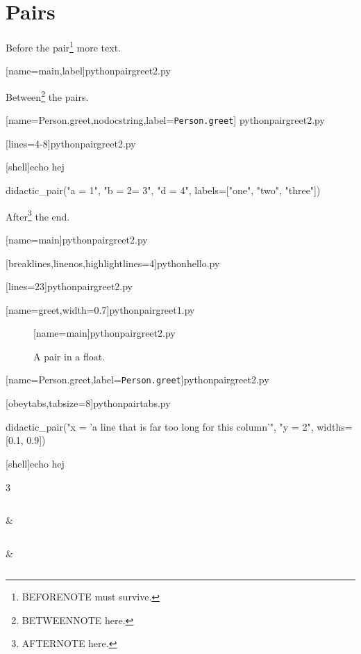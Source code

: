 \documentclass[a4paper]{memoir}
\begin{document}
\section{Pairs}
\lipsum[1][1-3] Before the pair\footnote{BEFORENOTE must survive.} more text.

%
  [name=main,label]{python}{pairgreet2.py}

Between\footnote{BETWEENNOTE here.} the pairs.

%
  [name=Person.greet,nodocstring,label={\texttt{Person.greet}}]%
  {python}{pairgreet2.py}

%
  [lines=4-8]{python}{pairgreet2.py}

[shell]{echo hej}

\begin{pycode}
didactic_pair("a = 1", "b = 2\nc = 3", "d = 4",
              labels=["one", "two", "three"])
\end{pycode}
After\footnote{AFTERNOTE here.} the end.

\begin{minipage}{0.6\textwidth}
[name=main]{python}{pairgreet2.py}
\end{minipage}

%
  [breaklines,linenos,highlightlines=4]{python}{hello.py}

[lines=23]{python}{pairgreet2.py}

%
  [name=greet,width=0.7]{python}{pairgreet1.py}

\begin{figure}[htbp]
[name=main]{python}{pairgreet2.py}
\caption{A pair in a float.}
\end{figure}

%
  [name=Person.greet,label={\texttt{Person.greet}}]{python}{pairgreet2.py}

%
  [obeytabs,tabsize=8]{python}{pairtabs.py}

\begin{pycode}
didactic_pair("x = 'a line that is far too long for this column'", "y = 2",
              widths=[0.1, 0.9])
\end{pycode}

%
  [shell]{echo hej}



\begin{didacticpair}{3}
  \inputminted[firstline=2]{python}{pairread.py} &
  \inputminted[firstline=2]{python}{pairread.py} &
  \inputminted[firstline=2]{python}{pairread.py}
\end{didacticpair}
\end{document}
